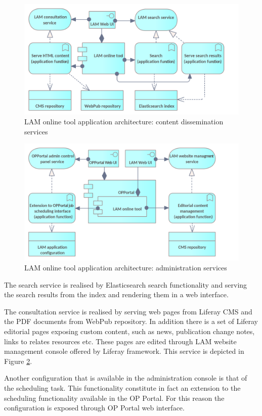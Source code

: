     \begin{figure}[!h]
	\centering
	\includegraphics[width=.78\textwidth]{images/application/Online tool - dissemination.png}
	\caption{LAM online tool application architecture: content dissemination services}
	\label{fig:app-online-tool-dissemination}
	\end{figure}
		

    \begin{figure}[!h]
	\centering
	\includegraphics[width=.67\textwidth]{images/application/Online tool - management.png}
	\caption{LAM online tool application architecture: administration services}
	\label{fig:app-online-tool-management}
	\end{figure}

	The search service is realised by Elasticsearch search functionality and serving the search results from the index and rendering them in a web interface. 
	
	The consultation service is realised by serving web pages from Liferay CMS and the PDF documents from WebPub repository. In addition there is a set of Liferay editorial pages exposing custom content, such as news, publication change notes, links to relates resources etc. These pages are edited through LAM website management console offered by Liferay framework. This service is depicted in Figure \ref{fig:app-online-tool-management}. 
	
	Another configuration that is available in the administration console is that of the scheduling task. This functionality constitute in fact an extension to the scheduling functionality available in the OP Portal. For this reason the configuration is exposed through OP Portal web interface. 
	
